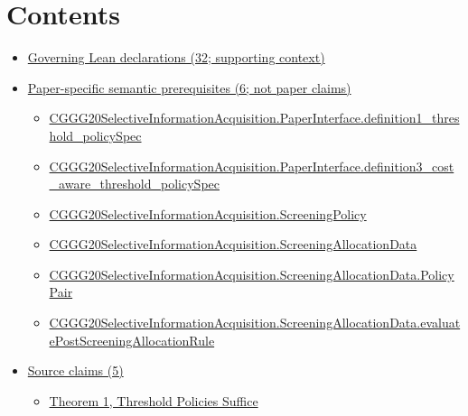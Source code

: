 \documentclass[10pt]{article}
\begin{document}
\section*{Contents}
\begin{itemize}[leftmargin=1.2em]
\item \hyperlink{governing-declaration-section-5ef5ef0364b6939c}{Governing Lean declarations (32; supporting context)}
\item \hyperlink{paper-prerequisite-section-5ef5ef0364b6939c}{Paper-specific semantic prerequisites (6; not paper claims)}
\begin{itemize}[leftmargin=1.2em]
\item \hyperlink{paper-prerequisite-93d2f839d80dac2a}{CGGG20\allowbreak{}Selective\allowbreak{}Information\allowbreak{}Acquisition.\allowbreak{}Paper\allowbreak{}Interface.\allowbreak{}definition1\_\allowbreak{}threshold\_\allowbreak{}policy\allowbreak{}Spec}
\item \hyperlink{paper-prerequisite-9db3d25783c683bb}{CGGG20\allowbreak{}Selective\allowbreak{}Information\allowbreak{}Acquisition.\allowbreak{}Paper\allowbreak{}Interface.\allowbreak{}definition3\_\allowbreak{}cost\_\allowbreak{}aware\_\allowbreak{}threshold\_\allowbreak{}policy\allowbreak{}Spec}
\item \hyperlink{paper-prerequisite-88f67c493873ffe9}{CGGG20\allowbreak{}Selective\allowbreak{}Information\allowbreak{}Acquisition.\allowbreak{}Screening\allowbreak{}Policy}
\item \hyperlink{paper-prerequisite-f3c5f56c4a8e4ac3}{CGGG20\allowbreak{}Selective\allowbreak{}Information\allowbreak{}Acquisition.\allowbreak{}Screening\allowbreak{}Allocation\allowbreak{}Data}
\item \hyperlink{paper-prerequisite-8a6d79f3e51b72a6}{CGGG20\allowbreak{}Selective\allowbreak{}Information\allowbreak{}Acquisition.\allowbreak{}Screening\allowbreak{}Allocation\allowbreak{}Data.\allowbreak{}Policy\allowbreak{}Pair}
\item \hyperlink{paper-prerequisite-3efd2fe988b66752}{CGGG20\allowbreak{}Selective\allowbreak{}Information\allowbreak{}Acquisition.\allowbreak{}Screening\allowbreak{}Allocation\allowbreak{}Data.\allowbreak{}evaluate\allowbreak{}Post\allowbreak{}Screening\allowbreak{}Allocation\allowbreak{}Rule}
\end{itemize}
\item \hyperlink{source-section-f10b5f68e4acf3dc}{Source claims (5)}
\begin{itemize}[leftmargin=1.2em]
\item \hyperlink{source-claim-17512b233837b061}{Theorem 1, Threshold Policies Suffice}

\end{itemize}
\end{itemize}
\end{document}
